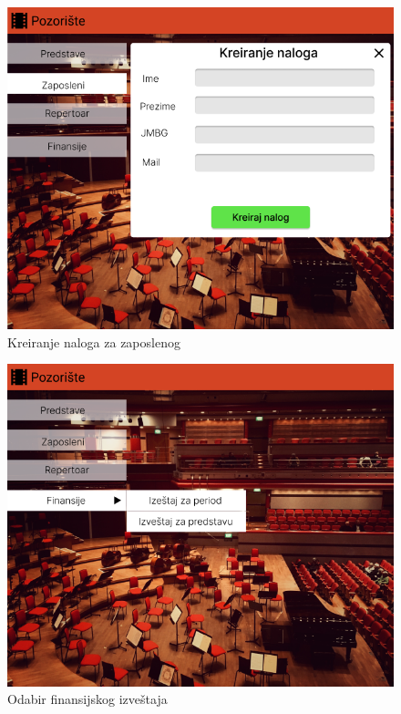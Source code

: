 \documentclass[a4paper]{article}
\begin{document}
\begin{figure}[H]
  \begin{center}
    \includegraphics[width=130mm]{../images/supervizor_kreiranje_naloga.png}
  \end{center}
  \caption{Kreiranje naloga za zaposlenog}
  \label{supervizor_kreiranje_naloga}
\end{figure}

\begin{figure}[H]
  \begin{center}
    \includegraphics[width=130mm]{../images/supervizor_finansije.png}
  \end{center}
  \caption{Odabir finansijskog izveštaja}
  \label{supervizor_finansije}
\end{figure}
\end{document}
